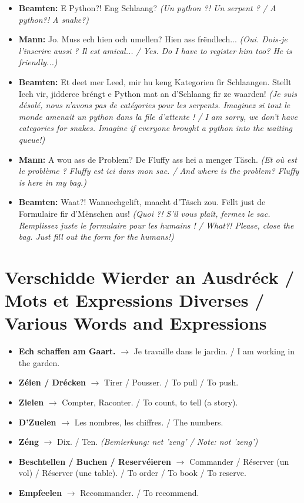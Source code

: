 \begin{itemize}
    \item \textbf{Beamten:} E Python?! Eng Schlaang? \textit{(Un python ?! Un serpent ? / A python?! A snake?)}
    \item \textbf{Mann:} Jo. Muss ech hien och umellen? Hien ass frëndlech... \textit{(Oui. Dois-je l'inscrire aussi ? Il est amical... / Yes. Do I have to register him too? He is friendly...)}
    \item \textbf{Beamten:} Et deet mer Leed, mir hu keng Kategorien fir Schlaangen. Stellt Iech vir, jidderee bréngt e Python mat an d'Schlaang fir ze waarden! \textit{(Je suis désolé, nous n'avons pas de catégories pour les serpents. Imaginez si tout le monde amenait un python dans la file d'attente ! / I am sorry, we don't have categories for snakes. Imagine if everyone brought a python into the waiting queue!)}
    \item \textbf{Mann:} A wou ass de Problem? De Fluffy ass hei a menger Täsch. \textit{(Et où est le problème ? Fluffy est ici dans mon sac. / And where is the problem? Fluffy is here in my bag.)}
    \item \textbf{Beamten:} Waat?! Wannechgelift, maacht d'Täsch zou. Fëllt just de Formulaire fir d'Mënschen aus! \textit{(Quoi ?! S'il vous plaît, fermez le sac. Remplissez juste le formulaire pour les humains ! / What?! Please, close the bag. Just fill out the form for the humans!)}
\end{itemize}

\vspace{1cm}

\section{Verschidde Wierder an Ausdréck / Mots et Expressions Diverses / Various Words and Expressions}

\begin{itemize}
    \item \textbf{Ech schaffen am Gaart.} $\rightarrow$ Je travaille dans le jardin. / I am working in the garden.
    \item \textbf{Zéien / Drécken} $\rightarrow$ Tirer / Pousser. / To pull / To push.
    \item \textbf{Zielen} $\rightarrow$ Compter, Raconter. / To count, to tell (a story).
    \item \textbf{D'Zuelen} $\rightarrow$ Les nombres, les chiffres. / The numbers.
    \item \textbf{Zéng} $\rightarrow$ Dix. / Ten. \textit{(Bemierkung: net 'zeng' / Note: not 'zeng')}
    \item \textbf{Beschtellen / Buchen / Reservéieren} $\rightarrow$ Commander / Réserver (un vol) / Réserver (une table). / To order / To book / To reserve.
    \item \textbf{Empfeelen} $\rightarrow$ Recommander. / To recommend.
\end{itemize}

